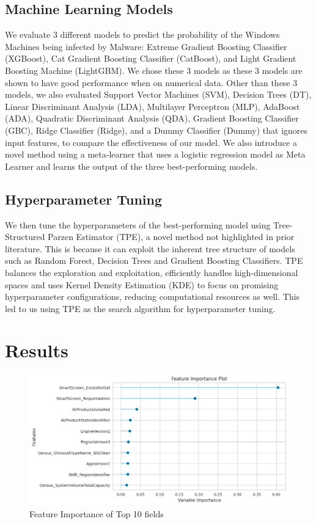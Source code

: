 \documentclass[runningheads]{llncs}
\begin{document}
\subsection{Machine Learning Models}
We evaluate 3 different models to predict the probability of the Windows Machines being infected by Malware: Extreme Gradient Boosting Classifier (XGBoost), Cat Gradient Boosting Classifier (CatBoost), and Light Gradient Boosting Machine (LightGBM). We chose these 3 models as these 3 models are shown to have good performance when on numerical data. Other than these 3 models, we also evaluated Support Vector Machines (SVM), Decision Trees (DT), Linear Discriminant Analysis (LDA), Multilayer Perceptron (MLP), AdaBoost (ADA), Quadratic Discriminant Analysis (QDA), Gradient Boosting Classifier (GBC), Ridge Classifier (Ridge), and a Dummy Classifier (Dummy) that ignores input features, to compare the effectiveness of our model. We also introduce a novel method using a meta-learner that uses a logistic regression model as Meta Learner and learns the output of the three best-performing models.

\subsection{Hyperparameter Tuning}
We then tune the hyperparameters of the best-performing model using Tree-Structured Parzen Estimator (TPE), a novel method not highlighted in prior literature. This is because it can exploit the inherent tree structure of models such as Random Forest, Decision Trees and Gradient Boosting Classifiers. TPE balances the exploration and exploitation, efficiently handles high-dimensional spaces and uses Kernel Density Estimation (KDE) to focus on promising hyperparameter configurations, reducing computational resources as well. This led to us using TPE as the search algorithm for hyperparameter tuning.

\section{Results}

\begin{figure}[!h]
\includegraphics[scale=0.5]{images/importance.png}
\centering
\caption{Feature Importance of Top 10 fields}
\label{Fig 3}
\end{figure}
\end{document}
